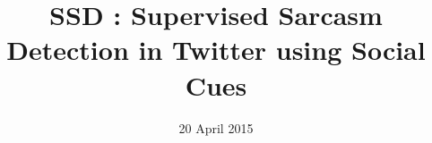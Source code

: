\documentclass[10pt,conference]{IEEEtran}
\begin{document}
\title{SSD : Supervised Sarcasm Detection in Twitter using Social Cues}

\author{
}


\date{20 April 2015}

\maketitle


%

%
%






%
%
%



{\footnotesize}
\end{document}
